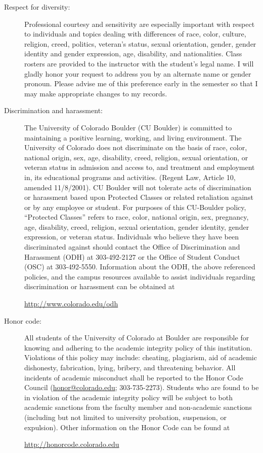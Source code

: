 \documentclass[11pt]{article}
\begin{document}
\begin{description}
\item[Respect for diversity:] Professional courtesy and sensitivity
  are especially important with respect to individuals and topics
  dealing with differences of race, color, culture, religion, creed,
  politics, veteran's status, sexual orientation, gender, gender
  identity and gender expression, age, disability, and nationalities.
  Class rosters are provided to the instructor with the student's
  legal name. I will gladly honor your request to address you by an
  alternate name or gender pronoun. Please advise me of this
  preference early in the semester so that I may make appropriate
  changes to my records.

\item[Discrimination and harassment:] The University of Colorado
  Boulder (CU Boulder) is committed to maintaining a positive
  learning, working, and living environment. The University of
  Colorado does not discriminate on the basis of race, color, national
  origin, sex, age, disability, creed, religion, sexual orientation,
  or veteran status in admission and access to, and treatment and
  employment in, its educational programs and activities. (Regent Law,
  Article 10, amended 11/8/2001).  CU Boulder will not tolerate acts
  of discrimination or harassment based upon Protected Classes or
  related retaliation against or by any employee or student. For
  purposes of this CU-Boulder policy, ``Protected Classes'' refers to
  race, color, national origin, sex, pregnancy, age, disability,
  creed, religion, sexual orientation, gender identity, gender
  expression, or veteran status.  Individuals who believe they have
  been discriminated against should contact the Office of
  Discrimination and Harassment (ODH) at 303-492-2127 or the Office of
  Student Conduct (OSC) at 303-492-5550.  Information about the ODH,
  the above referenced policies, and the campus resources available to
  assist individuals regarding discrimination or harassment can be
  obtained at
  \begin{center}
    \url{http://www.colorado.edu/odh}
  \end{center}

\item[Honor code:] All students of the University of Colorado at
  Boulder are responsible for knowing and adhering to the academic
  integrity policy of this institution.  Violations of this policy may
  include: cheating, plagiarism, aid of academic dishonesty,
  fabrication, lying, bribery, and threatening behavior.  All
  incidents of academic misconduct shall be reported to the Honor Code
  Council (\href{mailto:honor@colorado.edu}{honor@colorado.edu};
  303-735-2273). Students who are found to be in violation of the
  academic integrity policy will be subject to both academic sanctions
  from the faculty member and non-academic sanctions (including but
  not limited to university probation, suspension, or
  expulsion). Other information on the Honor Code can be found at
  \begin{center}
    \url{http://honorcode.colorado.edu}
  \end{center}
\end{description}
\end{document}
